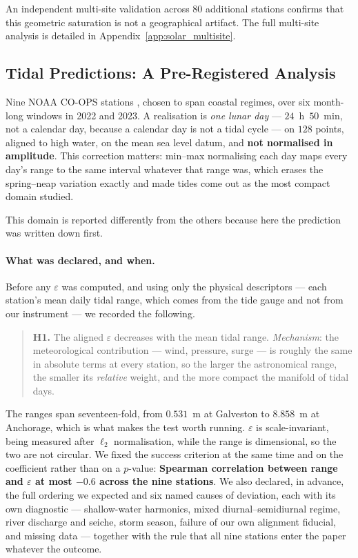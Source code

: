 \documentclass[10pt]{article}
\theoremstyle{plain}
\theoremstyle{definition}
\theoremstyle{remark}
\begin{document}
An independent multi-site validation across 80 additional stations confirms that this geometric saturation is not a geographical artifact. The full multi-site analysis is detailed in Appendix~\ref{app:solar_multisite}.

\subsection{Tidal Predictions: A Pre-Registered Analysis}
\label{sec:results-tides}

Nine NOAA CO-OPS stations \citep{noaa_coops_tidescurrents}, chosen to span
coastal regimes, over six month-long windows in 2022 and 2023. A realisation is
\emph{one lunar day} --- $24$~h~$50$~min, not a calendar day, because a calendar
day is not a tidal cycle --- on $128$ points, aligned to high water, on the mean
sea level datum, and \textbf{not normalised in amplitude}. This correction matters: min--max
normalising each day maps every day's range to the same interval whatever that
range was, which erases the spring--neap variation exactly and made tides come
out as the most compact domain studied.

This domain is reported differently from the others because here the prediction
was written down first.

\paragraph{What was declared, and when.}
Before any $\varepsilon$ was computed, and using only the physical descriptors
--- each station's mean daily tidal range, which comes from the tide gauge and
not from our instrument --- we recorded the following.

\begin{quote}
\textbf{H1.} The aligned $\varepsilon$ decreases with the mean tidal range.
\emph{Mechanism}: the meteorological contribution --- wind, pressure, surge ---
is roughly the same in absolute terms at every station, so the larger the
astronomical range, the smaller its \emph{relative} weight, and the more compact
the manifold of tidal days.
\end{quote}

The ranges span seventeen-fold, from $0.531$~m at Galveston to $8.858$~m at
Anchorage, which is what makes the test worth running. $\varepsilon$ is
scale-invariant, being measured after $\ell_2$ normalisation, while the range is
dimensional, so the two are not circular. We fixed the success criterion at the
same time and on the coefficient rather than on a $p$-value: \textbf{Spearman
correlation between range and $\varepsilon$ at most $-0.6$ across the nine
stations}. We also declared, in advance, the full ordering we expected and six
named causes of deviation, each with its own diagnostic --- shallow-water
harmonics, mixed diurnal--semidiurnal regime, river discharge and seiche, storm
season, failure of our own alignment fiducial, and missing data --- together
with the rule that all nine stations enter the paper whatever the outcome.
\end{document}
